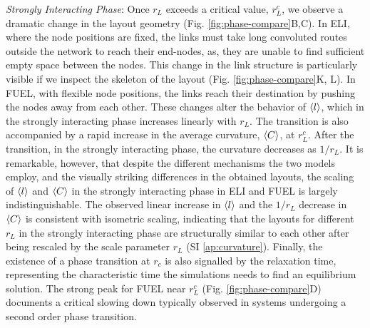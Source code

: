 \documentclass[nofootinbib,preprint,floatfix,titlepage,superscriptaddress]{revtex4} %
\begin{document}
{\em Strongly Interacting Phase}: Once  $r_L$ exceeds a critical value, $r_L^c$, we observe a dramatic change in the layout geometry (Fig. \ref{fig:phase-compare}B,C). 
In ELI, where the node positions are fixed, the links must take long convoluted routes outside the network to reach their end-nodes, as, they are unable to find sufficient empty space between the nodes.  
This change in the link structure is particularly visible if we inspect the skeleton of the layout (Fig. \ref{fig:phase-compare}K, L).
In FUEL, with flexible node positions, the links reach their destination by pushing the nodes away from each other. 
These changes alter the behavior of $\left<l\right>$, which in the strongly interacting phase increases linearly with $r_L$. 
The transition is also accompanied by a rapid increase in the average curvature, $\left<C\right>$,  at $r^c_L$. %
After the transition, in the strongly interacting phase, the curvature decreases as $1/r_L$. 
It is remarkable, however, that despite the different mechanisms the two models employ, and the visually striking differences in the obtained layouts, the scaling of $\left<l\right>$ and $\left<C\right>$ in the strongly interacting phase in ELI and FUEL is largely indistinguishable. 
The observed linear increase in $\left<l\right>$ and the $1/r_L$ decrease in $\left<C\right>$ is consistent with isometric scaling, indicating that the layouts for different $r_L$ in the strongly interacting phase are structurally similar to each other after being rescaled by the scale parameter $r_L$ %
(SI \ref{ap:curvature}). 
Finally, the existence of a phase transition at $r_c$ is also signalled by
the relaxation time, representing the characteristic time the simulations needs to find an equilibrium solution. The strong peak for FUEL near $r_L^c$ (Fig. \ref{fig:phase-compare}D)
documents a critical slowing down typically observed in systems undergoing a second order phase transition. 
\end{document}
